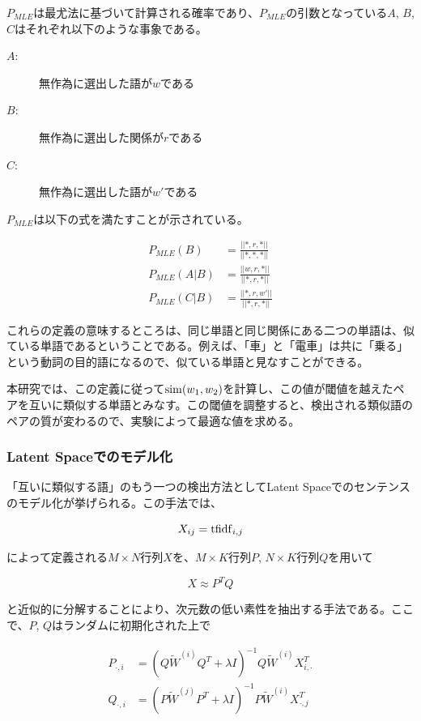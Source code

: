 \documentclass[12pt]{jarticle}
\begin{document}
$P_{MLE}$は最尤法に基づいて計算される確率であり、$P_{MLE}$の引数となっている$A$, $B$, $C$はそれぞれ以下のような事象である。

\begin{description}
  \item[$A$:]無作為に選出した語が$w$である
  \item[$B$:]無作為に選出した関係が$r$である
  \item[$C$:]無作為に選出した語が$w'$である
\end{description}

$P_{MLE}$は以下の式を満たすことが示されている。

\begin{align}
  P_{MLE}(B)   & = \frac{||*, r, *||}{||*, *, *||}\\
  P_{MLE}(A|B) & = \frac{||w, r, *||}{||*, r, *||}\\
  P_{MLE}(C|B) & = \frac{||*, r,w'||}{||*, r, *||}
\end{align}

これらの定義の意味するところは、同じ単語と同じ関係にある二つの単語は、似ている単語であるということである。例えば、「車」と「電車」は共に「乗る」という動詞の目的語になるので、似ている単語と見なすことができる。

本研究では、この定義に従って${\rm sim}(w_1, w_2)$を計算し、この値が閾値を越えたペアを互いに類似する単語とみなす。この閾値を調整すると、検出される類似語のペアの質が変わるので、実験によって最適な値を求める。

\subsubsection{Latent Spaceでのモデル化}
「互いに類似する語」のもう一つの検出方法としてLatent Spaceでのセンテンスのモデル化\cite{LatentSpace}が挙げられる。この手法では、

\begin{equation}
  X_{ij} = {\rm tfidf}_{i,j}
\end{equation}

によって定義される$M \times N$行列$X$を、$M \times K$行列$P$, $N \times K$行列$Q$を用いて

\begin{equation}
  X \approx P^T Q
\end{equation}

と近似的に分解することにより、次元数の低い素性を抽出する手法である。ここで、$P$, $Q$はランダムに初期化された上で

\begin{align}
  P_{\cdot ,i} &= (Q\tilde W^{(i)}Q^T + \lambda I)^{-1} Q \tilde W^{(i)} X_{i, \cdot }^T \\
  Q_{\cdot ,i} &= (P\tilde W^{(j)}P^T + \lambda I)^{-1} P \tilde W^{(i)} X_{\cdot , j}^T
\end{align}
\end{document}
